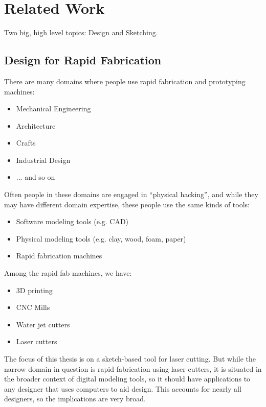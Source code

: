 \chapter{Related Work}

Two big, high level topics: Design and Sketching.

\section{Design for Rapid Fabrication}

There are many domains where people use rapid fabrication and prototyping machines:

\begin{itemize}
\item Mechanical Engineering
\item Architecture
\item Crafts
\item Industrial Design
\item ... and so on
\end{itemize}

Often people in these domains are engaged in ``physical hacking'', and
while they may have different domain expertise, these people use the
same kinds of tools:

\begin{itemize}
\item Software modeling tools (e.g. CAD)
\item Physical modeling tools (e.g. clay, wood, foam, paper)
\item Rapid fabrication machines
\end{itemize}

Among the rapid fab machines, we have:

\begin{itemize}
\item 3D printing
\item CNC Mills
\item Water jet cutters
\item Laser cutters
\end{itemize}

The focus of this thesis is on a sketch-based tool for laser
cutting. But while the narrow domain in question is rapid fabrication
using laser cutters, it is situated in the broader context of digital
modeling tools, so it should have applications to any designer that
uses computers to aid design. This accounts for nearly all designers,
so the implications are very broad.


